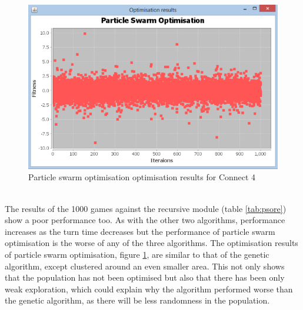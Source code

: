 \begin{figure}[tp]
   \begin{center}
     \includegraphics{Figures/psoconnect4}
   \end{center}
   \caption{Particle swarm optimisation optimisation results for Connect 4}
   \label{fig:psoconnect4}
\end{figure} 
\\The results of the 1000 games against the recursive module (table \ref{tab:psore}) show a poor performance too. As with the other two algorithms, performance increases as the turn time decreases but the performance of particle swarm optimisation is the worse of any of the three algorithms. The optimisation results of particle swarm optimisation, figure \ref{fig:psoconnect4}, are similar to that of the genetic algorithm, except clustered around an even smaller area. This not only shows that the population has not been optimised but also that there has been only weak exploration, which could explain why the algorithm performed worse than the genetic algorithm, as there will be less randomness in the population.

